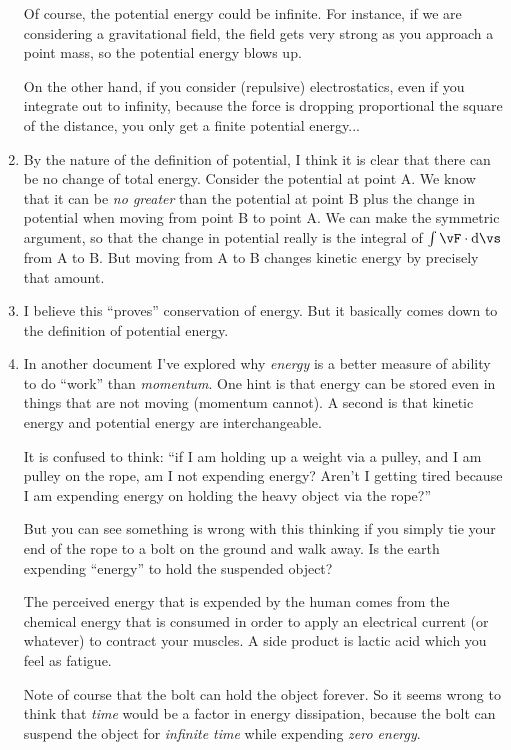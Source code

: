\begin{enumerate}
  Of course, the potential energy could be infinite. For instance, if we
  are considering a gravitational field, the field gets very strong as
  you approach a point mass, so the potential energy blows up.

  On the other hand, if you consider (repulsive) electrostatics, even if
  you integrate out to infinity, because the force is dropping
  proportional the square of the distance, you only get a finite
  potential energy...

  \item By the nature of the definition of potential, I think it is
  clear that there can be no change of total energy. Consider the
  potential at point A. We know that it can be \emph{no greater} than
  the potential at point B plus the change in potential when moving from
  point B to point A. We can make the symmetric argument, so that the
  change in potential really is the integral of $\int \vF \cdot
  \diff{\vs}$ from A to B. But moving from A to B changes kinetic energy
  by precisely that amount.

  \item I believe this ``proves'' conservation of energy. But it
  basically comes down to the definition of potential energy.

  \item In another document I've explored why \emph{energy} is a better
  measure of ability to do ``work'' than \emph{momentum}. One hint is
  that energy can be stored even in things that are not moving (momentum
  cannot). A second is that kinetic energy and potential energy are
  interchangeable.

  It is confused to think: ``if I am holding up a weight via a pulley,
  and I am pulley on the rope, am I not expending energy? Aren't I
  getting tired because I am expending energy on holding the heavy
  object via the rope?''

  But you can see something is wrong with this thinking if you simply
  tie your end of the rope to a bolt on the ground and walk away. Is the
  earth expending ``energy'' to hold the suspended object?

  The perceived energy that is expended by the human comes from the
  chemical energy that is consumed in order to apply an electrical
  current (or whatever) to contract your muscles. A side product is
  lactic acid which you feel as fatigue.

  Note of course that the bolt can hold the object forever. So it seems
  wrong to think that \emph{time} would be a factor in energy
  dissipation, because the bolt can suspend the object for
  \emph{infinite time} while expending \emph{zero energy}.


\end{enumerate}
